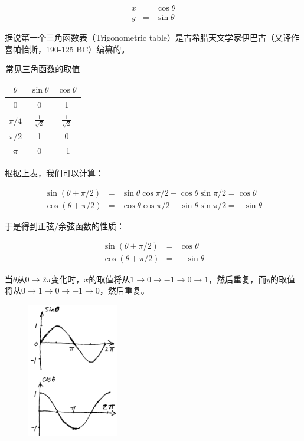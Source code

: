 \begin{eqnarray*}
x & = & \cos \theta \\
y & = &  \sin \theta 
\end{eqnarray*}

据说第一个三角函数表（Trigonometric table）是古希腊天文学家伊巴古（又译作喜帕恰斯，190-125 BC）编纂的。

\begin{table}[htdp]
\caption{常见三角函数的取值}
\begin{center}
\begin{tabular}{|c|c|c|}
\hline
$\theta$ & $\sin \theta$ &  $\cos \theta$ \\
\hline
0  &  0 &  1 \\
$\pi/4$ & $\frac{1}{\sqrt 2}$  & $\frac{1}{\sqrt 2}$ \\
$\pi/2$ & 1  &  0 \\
$\pi$ & 0 & -1 \\
\hline
\end{tabular}
\end{center}
\end{table}%

根据上表，我们可以计算：

\begin{eqnarray*}
\sin ( \theta + \pi /2) & = & \sin \theta \cos \pi /2 + \cos \theta  \sin \pi/2 = \cos \theta \\
\cos ( \theta + \pi /2) & = & \cos  \theta \cos \pi /2 - \sin \theta \sin \pi/2 = - \sin \theta
\end{eqnarray*}

于是得到正弦/余弦函数的性质：

\begin{eqnarray}
\sin ( \theta + \pi /2 ) & = & \cos \theta \\
\cos ( \theta + \pi /2) & = & - \sin \theta
\end{eqnarray}



当$\theta$从$0 \to 2\pi$变化时，$x$的取值将从$1 \to 0 \to -1 \to 0 \to 1$，然后重复，而$y$的取值将从$0 \to 1 \to 0 \to -1 \to 0$，然后重复。

\begin{figure}[htbp]
\begin{center}
\includegraphics[width=4cm]{Preface/sincostheta.png}
\end{center}
\end{figure}


